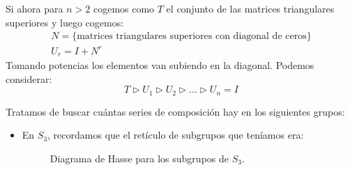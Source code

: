 \begin{ejemplo}
    \noindent
    Si ahora para $n>2$ cogemos como $T$ el conjunto de las matrices triangulares superiores y luego cogemos:
    \begin{gather*}
        N = \{\text{matrices triangulares superiores con diagonal de ceros}\} \\
        U_r = I + N^r
    \end{gather*}
    Tomando potencias los elementos van subiendo en la diagonal. Podemos considerar:
    \begin{equation*}
        T \rhd U_1 \rhd U_2 \rhd \ldots \rhd U_n = I
    \end{equation*}
\end{ejemplo}

\begin{ejemplo} %
    Tratamos de buscar cuántas series de composición hay en los siguientes grupos:
    \begin{itemize}
        \item En $S_3$, recordamos que el retículo de subgrupos que teníamos era:
            \begin{figure}[H]
                \centering
                \caption{Diagrama de Hasse para los subgrupos de $S_3$.}
            \end{figure}


\end{itemize}
\end{ejemplo}
